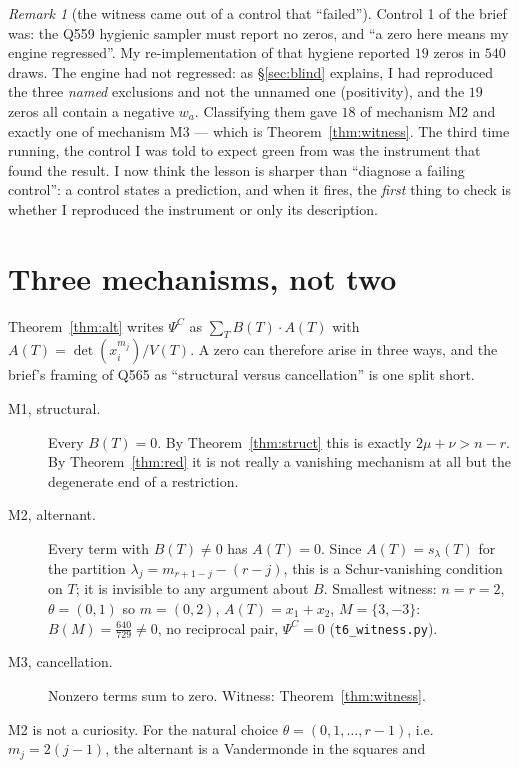 \documentclass[11pt]{article}
\theoremstyle{definition}
\theoremstyle{remark}
\newtheorem{remark}[theorem]{Remark}
\newcommand{\PsiC}{\Psi^{C}}
\begin{document}
\begin{remark}[the witness came out of a control that ``failed'']
Control 1 of the brief was: the Q559 hygienic sampler must report no zeros, and
``a zero here means my engine regressed''. My re-implementation of that hygiene
reported $19$ zeros in $540$ draws. The engine had not regressed: as
\S\ref{sec:blind} explains, I had reproduced the three \emph{named} exclusions and
not the unnamed one (positivity), and the $19$ zeros all contain a negative
$w_a$. Classifying them gave $18$ of mechanism M2 and exactly one of mechanism M3
--- which is Theorem~\ref{thm:witness}. The third time running, the control I was
told to expect green from was the instrument that found the result. I now think
the lesson is sharper than ``diagnose a failing control'': a control states a
prediction, and when it fires, the \emph{first} thing to check is whether I
reproduced the instrument or only its description.
\end{remark}

\section{Three mechanisms, not two}\label{sec:mech}

Theorem~\ref{thm:alt} writes $\PsiC$ as $\sum_T B(T)\cdot A(T)$ with
$A(T)=\det(x_i^{m_j})/V(T)$. A zero can therefore arise in three ways, and the
brief's framing of Q565 as ``structural versus cancellation'' is one split short.

\begin{description}
\item[M1, structural.] Every $B(T)=0$. By Theorem~\ref{thm:struct} this is exactly
  $2\mu+\nu>n-r$. By Theorem~\ref{thm:red} it is not really a vanishing mechanism
  at all but the degenerate end of a restriction.
\item[M2, alternant.] Every term with $B(T)\ne0$ has $A(T)=0$. Since
  $A(T)=s_\lambda(T)$ for the partition $\lambda_j=m_{r+1-j}-(r-j)$, this is a
  Schur-vanishing condition on $T$; it is invisible to any argument about
  $B$. Smallest witness: $n=r=2$, $\theta=(0,1)$ so $m=(0,2)$,
  $A(T)=x_1+x_2$, $M=\{3,-3\}$: $B(M)=\tfrac{640}{729}\ne0$, no reciprocal pair,
  $\PsiC=0$ (\texttt{t6\_witness.py}).
\item[M3, cancellation.] Nonzero terms sum to zero. Witness:
  Theorem~\ref{thm:witness}.
\end{description}

M2 is not a curiosity. For the natural choice $\theta=(0,1,\dots,r-1)$, i.e.\
$m_j=2(j-1)$, the alternant is a Vandermonde in the squares and
\end{document}
